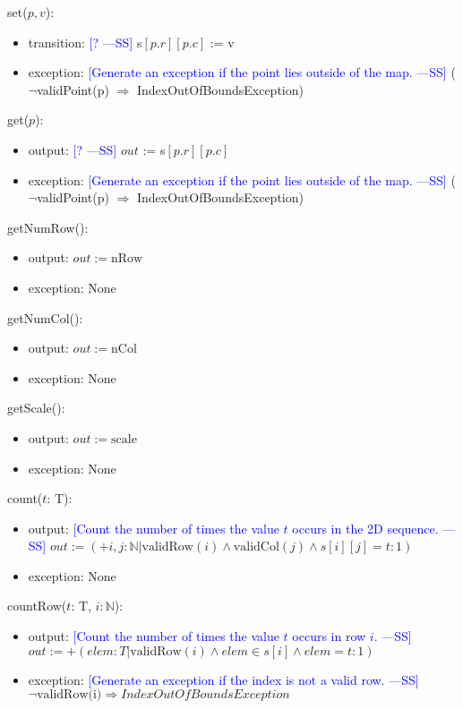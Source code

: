 \documentclass[12pt]{article}
\newcommand{\authornote}[3]{\textcolor{#1}{[#3 ---#2]}}
\newcommand{\authornote}[3]{}
\newcommand{\wss}[1]{\authornote{blue}{SS}{#1}}
\begin{document}
\noindent set($p, v$):
\begin{itemize}
\item transition: \wss{?} s$[p.r][p.c]$ := v
\item exception: \wss{Generate an exception if the point lies outside of the
    map.} ($\neg$validPoint(p) $\Rightarrow$ IndexOutOfBoundsException)
\end{itemize}

\noindent get($p$):
\begin{itemize}
\item output: \wss{?} $out$ := s$[p.r][p.c]$
\item exception: \wss{Generate an exception if the point lies outside of the
    map.} ($\neg$validPoint(p) $\Rightarrow$ IndexOutOfBoundsException)
\end{itemize}

\noindent getNumRow():
\begin{itemize}
\item output: $out := \mbox{nRow}$
\item exception: None
\end{itemize}

\noindent getNumCol():
\begin{itemize}
\item output: $out := \mbox{nCol}$
\item exception: None
\end{itemize}

\noindent getScale():
\begin{itemize}
\item output: $out := \mbox{scale}$
\item exception: None
\end{itemize}

\noindent count($t$: T):
\begin{itemize}
\item output: \wss{Count the number of times the value $t$ occurs in the 2D
    sequence.} $out := (+i,j : \mathbb{N} | \text{validRow}(i) \wedge \text{validCol}(j) \wedge s[i][j] = t : 1)$
\item exception: None
\end{itemize}

\noindent countRow($t$: T, $i: \mathbb{N}$):
\begin{itemize}
\item output: \wss{Count the number of times the value $t$ occurs in row
    $i$.} $out:= + (elem:T | \text{validRow}(i) \wedge elem \in s[i] \wedge elem = t: 1)$
\item exception: \wss{Generate an exception if the index is not a valid
    row.} $\neg \text{validRow(i)} \Rightarrow IndexOutOfBoundsException$
\end{itemize}
\end{document}
